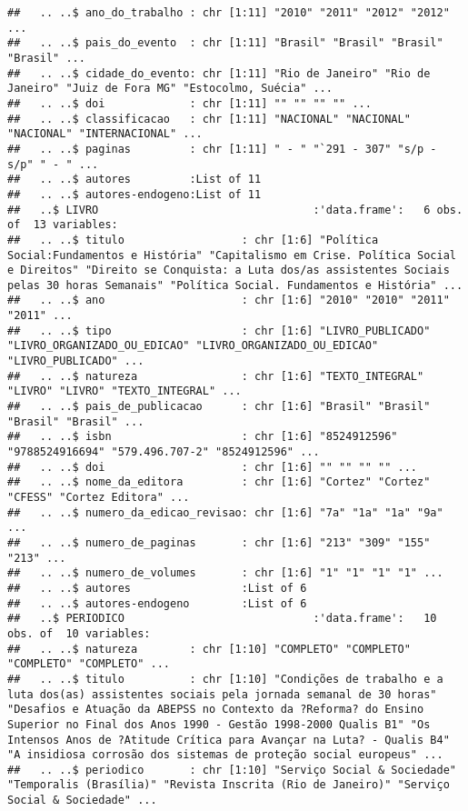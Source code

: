 \documentclass[]{article}
\begin{document}
\begin{verbatim}
##   .. ..$ ano_do_trabalho : chr [1:11] "2010" "2011" "2012" "2012" ...
##   .. ..$ pais_do_evento  : chr [1:11] "Brasil" "Brasil" "Brasil" "Brasil" ...
##   .. ..$ cidade_do_evento: chr [1:11] "Rio de Janeiro" "Rio de Janeiro" "Juiz de Fora MG" "Estocolmo, Suécia" ...
##   .. ..$ doi             : chr [1:11] "" "" "" "" ...
##   .. ..$ classificacao   : chr [1:11] "NACIONAL" "NACIONAL" "NACIONAL" "INTERNACIONAL" ...
##   .. ..$ paginas         : chr [1:11] " - " "`291 - 307" "s/p - s/p" " - " ...
##   .. ..$ autores         :List of 11
##   .. ..$ autores-endogeno:List of 11
##   ..$ LIVRO                                 :'data.frame':   6 obs. of  13 variables:
##   .. ..$ titulo                  : chr [1:6] "Política Social:Fundamentos e História" "Capitalismo em Crise. Política Social e Direitos" "Direito se Conquista: a Luta dos/as assistentes Sociais pelas 30 horas Semanais" "Política Social. Fundamentos e História" ...
##   .. ..$ ano                     : chr [1:6] "2010" "2010" "2011" "2011" ...
##   .. ..$ tipo                    : chr [1:6] "LIVRO_PUBLICADO" "LIVRO_ORGANIZADO_OU_EDICAO" "LIVRO_ORGANIZADO_OU_EDICAO" "LIVRO_PUBLICADO" ...
##   .. ..$ natureza                : chr [1:6] "TEXTO_INTEGRAL" "LIVRO" "LIVRO" "TEXTO_INTEGRAL" ...
##   .. ..$ pais_de_publicacao      : chr [1:6] "Brasil" "Brasil" "Brasil" "Brasil" ...
##   .. ..$ isbn                    : chr [1:6] "8524912596" "9788524916694" "579.496.707-2" "8524912596" ...
##   .. ..$ doi                     : chr [1:6] "" "" "" "" ...
##   .. ..$ nome_da_editora         : chr [1:6] "Cortez" "Cortez" "CFESS" "Cortez Editora" ...
##   .. ..$ numero_da_edicao_revisao: chr [1:6] "7a" "1a" "1a" "9a" ...
##   .. ..$ numero_de_paginas       : chr [1:6] "213" "309" "155" "213" ...
##   .. ..$ numero_de_volumes       : chr [1:6] "1" "1" "1" "1" ...
##   .. ..$ autores                 :List of 6
##   .. ..$ autores-endogeno        :List of 6
##   ..$ PERIODICO                             :'data.frame':   10 obs. of  10 variables:
##   .. ..$ natureza        : chr [1:10] "COMPLETO" "COMPLETO" "COMPLETO" "COMPLETO" ...
##   .. ..$ titulo          : chr [1:10] "Condições de trabalho e a luta dos(as) assistentes sociais pela jornada semanal de 30 horas" "Desafios e Atuação da ABEPSS no Contexto da ?Reforma? do Ensino Superior no Final dos Anos 1990 - Gestão 1998-2000 Qualis B1" "Os Intensos Anos de ?Atitude Crítica para Avançar na Luta? - Qualis B4" "A insidiosa corrosão dos sistemas de proteção social europeus" ...
##   .. ..$ periodico       : chr [1:10] "Serviço Social & Sociedade" "Temporalis (Brasília)" "Revista Inscrita (Rio de Janeiro)" "Serviço Social & Sociedade" ...

\end{verbatim}
\end{document}
